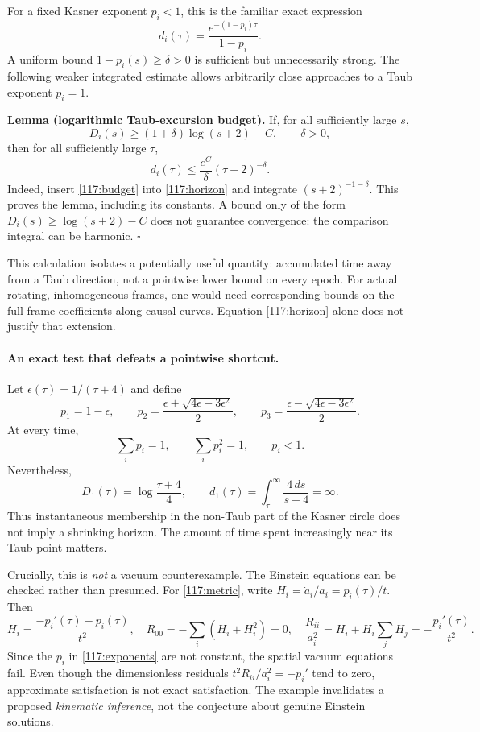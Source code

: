 \documentclass[11pt,a4paper]{article}
\numberwithin{equation}{section}
\begin{document}
For a fixed Kasner exponent $p_i<1$, this is the familiar exact expression
\[
 d_i(\tau)=\frac{e^{-(1-p_i)\tau}}{1-p_i}.
\]
A uniform bound $1-p_i(s)\ge\delta>0$ is sufficient but unnecessarily strong.
The following weaker integrated estimate allows arbitrarily close approaches
to a Taub exponent $p_i=1$.

\textbf{Lemma (logarithmic Taub-excursion budget).}
If, for all sufficiently large $s$,
\begin{equation}\label{117:budget}
 D_i(s)\ge (1+\delta)\log(s+2)-C,
 \qquad \delta>0,
\end{equation}
then for all sufficiently large $\tau$,
\begin{equation}\label{117:tail}
 d_i(\tau)\le\frac{e^C}{\delta}(\tau+2)^{-\delta}.
\end{equation}
Indeed, insert \eqref{117:budget} into \eqref{117:horizon} and integrate
$(s+2)^{-1-\delta}$. This proves the lemma, including its constants.
A bound only of the form $D_i(s)\ge\log(s+2)-C$ does not guarantee convergence:
the comparison integral can be harmonic. $\square$

This calculation isolates a potentially useful quantity: accumulated time
away from a Taub direction, not a pointwise lower bound on every epoch.
For actual rotating, inhomogeneous frames, one would need corresponding
bounds on the full frame coefficients along causal curves. Equation
\eqref{117:horizon} alone does not justify that extension.

\paragraph{An exact test that defeats a pointwise shortcut.}
Let $\epsilon(\tau)=1/(\tau+4)$ and define
\begin{equation}\label{117:exponents}
 p_1=1-\epsilon,\qquad
 p_2=\frac{\epsilon+\sqrt{4\epsilon-3\epsilon^2}}2,\qquad
 p_3=\frac{\epsilon-\sqrt{4\epsilon-3\epsilon^2}}2.
\end{equation}
At every time,
\[
 \sum_i p_i=1,\qquad \sum_i p_i^2=1,\qquad p_i<1.
\]
Nevertheless,
\[
 D_1(\tau)=\log\frac{\tau+4}{4},\qquad
 d_1(\tau)=\int_\tau^\infty\frac{4\,ds}{s+4}=\infty.
\]
Thus instantaneous membership in the non-Taub part of the Kasner circle
does not imply a shrinking horizon. The amount of time spent increasingly
near its Taub point matters.

Crucially, this is \emph{not} a vacuum counterexample. The Einstein equations
can be checked rather than presumed. For \eqref{117:metric}, write
$H_i=\dot a_i/a_i=p_i(\tau)/t$. Then
\[
 \dot H_i=\frac{-p_i'(\tau)-p_i(\tau)}{t^2},
 \quad
 R_{00}=-\sum_i(\dot H_i+H_i^2)=0,
 \quad
 \frac{R_{ii}}{a_i^2}=\dot H_i+H_i\sum_jH_j
                  =-\frac{p_i'(\tau)}{t^2}.
\]
Since the $p_i$ in \eqref{117:exponents} are not constant, the spatial vacuum
equations fail. Even though the dimensionless residuals
$t^2R_{ii}/a_i^2=-p_i'$ tend to zero, approximate satisfaction is not exact
satisfaction. The example invalidates a proposed \emph{kinematic inference},
not the conjecture about genuine Einstein solutions.
\end{document}
